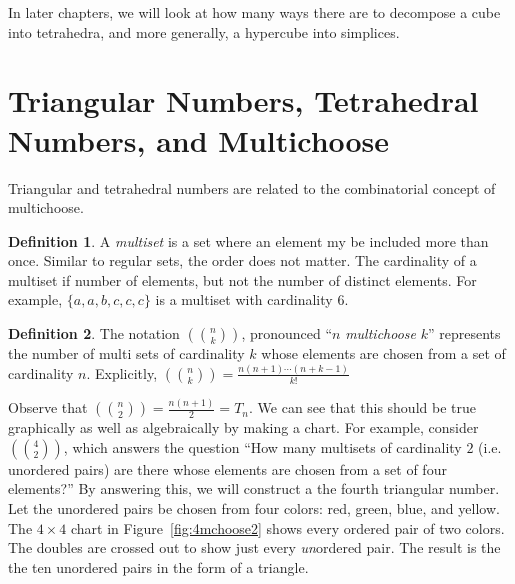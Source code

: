 \documentclass[12pt]{scrippsthesis}
\newcommand{\mchoose}[2]{{\textstyle \left( \! {#1 \choose #2} \! \right)}}
\theoremstyle{definition}
\newtheorem{dfn}{Definition}[section]
\theoremstyle{remark}
\theoremstyle{plain}
\begin{document}
In later chapters, we will look at how many ways there are to decompose a cube into tetrahedra, and more generally, a hypercube into simplices.

\section{ Triangular Numbers, Tetrahedral Numbers, and Multichoose }



Triangular and tetrahedral numbers are related to the combinatorial concept of multichoose.

\begin{dfn}
A \emph{multiset} is a set where an element my be included more than once.  Similar to regular sets, the order does not matter.  The cardinality of a multiset if number of elements, but not the number of distinct elements.  For example, $\{a,a,b,c,c,c\}$ is a multiset with cardinality $6$.
\end{dfn}

\begin{dfn}
The notation $\mchoose{n}{k}$, pronounced ``$n$ \emph{multichoose} $k$'' represents the number of multi sets of cardinality $k$ whose elements are chosen from a set of cardinality $n$.  Explicitly, $\mchoose{n}{k}=\frac{n(n+1)\dotsb(n+k-1)}{k!}$
\end{dfn}


Observe that $\mchoose{n}{2}=\frac{n(n+1)}{2} = T_n$.  We can see that this should be true graphically as well as algebraically by making a chart.  For example, consider $\mchoose{4}{2}$, which answers the question ``How many multisets of cardinality $2$ (i.e. unordered pairs) are there whose elements are chosen from a set of four elements?''  By answering this, we will construct a the fourth triangular number.  Let the unordered pairs be chosen from four colors: red, green, blue, and yellow.  The $4\times4$ chart in Figure~\ref{fig:4mchoose2} shows every ordered pair of two colors.  The doubles are crossed out to show just every \emph{un}ordered pair.  The result is the the ten unordered pairs in the form of a triangle.
\end{document}
